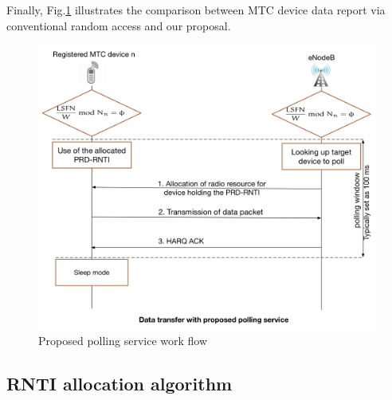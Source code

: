 Finally, Fig.\ref{fig:Comparison} illustrates the comparison between MTC device data report via conventional random access and our proposal.

\begin{figure}[!t]
	\centering
	\includegraphics[width=\linewidth]{Chapter6/Figures/proposed-polling-service}
	\caption{Proposed polling service work flow}
	\label{fig:Comparison}
\end{figure}
\subsection{RNTI allocation algorithm}
\label{prposed_algorithm}

